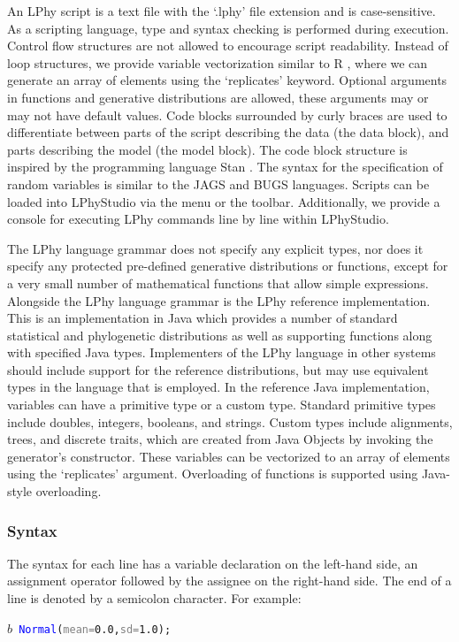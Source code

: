 \documentclass[10pt,letterpaper,table]{article}
\theoremstyle{definition}
\begin{document}
An LPhy script is a text file with the `.lphy' file extension and is case-sensitive. 
As a scripting language, type and syntax checking is performed during execution. 
Control flow structures are not allowed to encourage script readability. 
Instead of loop structures, we provide variable vectorization similar to R \cite{ihaka1996r}, where we can generate an array of elements using the `replicates' keyword. 
Optional arguments in functions and generative distributions are allowed, these arguments may or may not have default values. 
Code blocks surrounded by curly braces are used to differentiate between parts of the script describing the data (the data block), and parts describing the model (the model block). 
The code block structure is inspired by the programming language Stan \cite{carpenter2017stan}. 
The syntax for the specification of random variables is similar to the JAGS \cite{plummer2004jags} and BUGS \cite{lunn2009bugs, gilks1994language} languages. 
Scripts can be loaded into LPhyStudio via the menu or the toolbar. 
Additionally, we provide a console for executing LPhy commands line by line within LPhyStudio. 

The LPhy language grammar does not specify any explicit types, nor does it specify any protected pre-defined generative distributions or functions, except for a very small number of mathematical functions that allow simple expressions. 
Alongside the LPhy language grammar is the LPhy reference implementation. 
This is an implementation in Java which provides a number of standard statistical and phylogenetic distributions as well as supporting functions along with specified Java types. 
Implementers of the LPhy language in other systems should include support for the reference distributions, but may use equivalent types in the language that is employed.
In the reference Java implementation, variables can have a primitive type or a custom type.  
Standard primitive types include doubles, integers, booleans, and strings. 
Custom types include alignments, trees, and discrete traits, which are created from Java Objects by invoking the generator's constructor. 
These variables can be vectorized to an array of elements using the `replicates' argument. 
Overloading of functions is supported using Java-style overloading. 


\subsubsection{Syntax}
The syntax for each line has a variable declaration on the left-hand side, an assignment operator followed by the assignee on the right-hand side. 
The end of a line is denoted by a semicolon character.
For example: 
{
  \small
  \begin{listing}
    \begin{alltt}
    \textcolor{bluishgreen}{\(b\)}  ~ \textcolor{blue}{Normal}(\textcolor{gray}{mean=} \textcolor{constant}{0.0}, \textcolor{gray}{sd=}\textcolor{constant}{1.0});
    \end{alltt}
  \end{listing}
}
\end{document}
